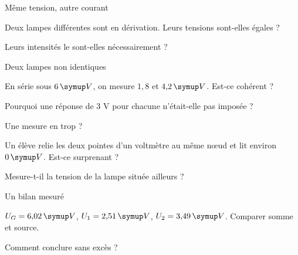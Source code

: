 \par\noindent\begin{minipage}{\linewidth}
\begin{exercice}[2]{Même tension, autre courant}
\begin{questions}
\item Deux lampes différentes sont en dérivation. Leurs tensions sont-elles égales ?
\item Leurs intensités le sont-elles nécessairement ?
\end{questions}
\end{exercice}
\end{minipage}
\clearpage{}
\par\noindent\begin{minipage}{\linewidth}
\begin{exercice}[3]{Deux lampes non identiques}
\begin{questions}
\item En série sous $6\unite V$, on mesure $1{,}8$ et $4{,}2\unite V$. Est-ce cohérent ?
\item Pourquoi une réponse de 3 V pour chacune n’était-elle pas imposée ?
\end{questions}
\end{exercice}
\end{minipage}
\par\noindent\begin{minipage}{\linewidth}
\begin{exercice}[3]{Une mesure en trop ?}
\begin{questions}
\item Un élève relie les deux pointes d’un voltmètre au même nœud et lit environ $0\unite V$. Est-ce surprenant ?
\item Mesure-t-il la tension de la lampe située ailleurs ?
\end{questions}
\end{exercice}
\end{minipage}
\par\noindent\begin{minipage}{\linewidth}
\begin{exercice}[3]{Un bilan mesuré}
\begin{questions}
\item $U_G=6{,}02\unite V$, $U_1=2{,}51\unite V$, $U_2=3{,}49\unite V$. Comparer somme et source.
\item Comment conclure sans excès ?
\end{questions}
\end{exercice}
\end{minipage}
